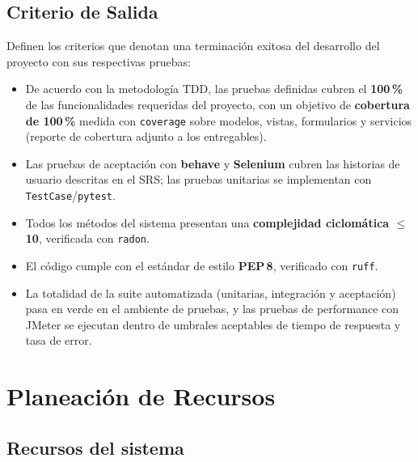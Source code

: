 \documentclass[12pt,letterpaper]{report}
\begin{document}
\section{Criterio de Salida}

Definen los criterios que denotan una terminación exitosa del desarrollo del
proyecto con sus respectivas pruebas:

\begin{itemize}[leftmargin=*]
  \item De acuerdo con la metodología TDD, las pruebas definidas cubren el
  \textbf{100\,\%} de las funcionalidades requeridas del proyecto, con un
  objetivo de \textbf{cobertura de 100\,\%} medida con \texttt{coverage} sobre
  modelos, vistas, formularios y servicios (reporte de cobertura adjunto a los
  entregables).
  \item Las pruebas de aceptación con \textbf{behave} y \textbf{Selenium} cubren
  las historias de usuario descritas en el SRS; las pruebas unitarias se
  implementan con \texttt{TestCase}/\texttt{pytest}.
  \item Todos los métodos del sistema presentan una \textbf{complejidad
  ciclomática $\leq$ 10}, verificada con \texttt{radon}.
  \item El código cumple con el estándar de estilo \textbf{PEP\,8}, verificado
  con \texttt{ruff}.
  \item La totalidad de la suite automatizada (unitarias, integración y
  aceptación) pasa en verde en el ambiente de pruebas, y las pruebas de
  performance con JMeter se ejecutan dentro de umbrales aceptables de tiempo de
  respuesta y tasa de error.
\end{itemize}

\chapter{Planeación de Recursos}

\section{Recursos del sistema}
\end{document}
